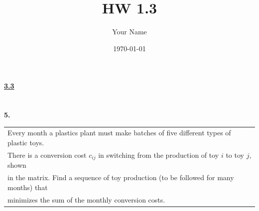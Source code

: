 \documentclass[12pt, letterpaper]{article}
\title{HW 1.3}
\author{Your Name}
\date{\today}
\begin{document}
\paragraph{\underline{3.3} \\ \\} 
\textbf{5.}\begin{tabular}[t]{l}
    Every month a plastics plant must make batches of five different types of plastic toys. \\
    There is a conversion cost $c_{ij}$ in switching from the production of toy $i$ to toy $j$, shown \\
    in the matrix. Find a sequence of toy production (to be followed for many months) that \\
    minimizes the sum of the monthly conversion costs.
\end{tabular}
\end{document}
